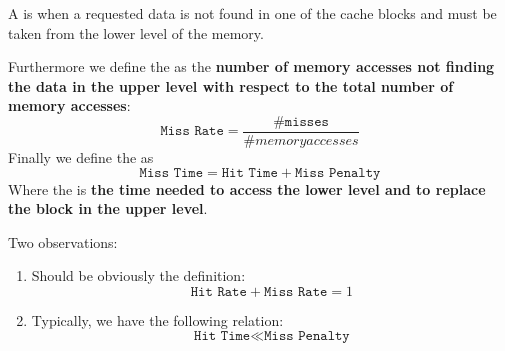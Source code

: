 \begin{definitionbox}
    A  is when a requested data is not found in one of the cache blocks and must be taken from the lower level of the memory.
\end{definitionbox}

\noindent
Furthermore we define the  as the \textbf{number of memory accesses not finding the data in the upper level with respect to the total number of memory accesses}:
\begin{equation*}
    \texttt{Miss Rate} = \dfrac{\texttt{\# misses}}{\# memory accesses}
\end{equation*}
Finally we define the  as
\begin{equation*}
    \texttt{Miss Time} = \texttt{Hit Time} + \texttt{Miss Penalty}
\end{equation*}
Where the  is \textbf{the time needed to access the lower level and to replace the block in the upper level}.

\highspace
Two observations:
\begin{enumerate}
    \item Should be obviously the definition:
    \begin{equation*}
        \texttt{Hit Rate} + \texttt{Miss Rate} = 1
    \end{equation*}

    \item Typically, we have the following relation:
    \begin{equation*}
        \texttt{Hit Time} \ll \texttt{Miss Penalty}
    \end{equation*}
\end{enumerate}